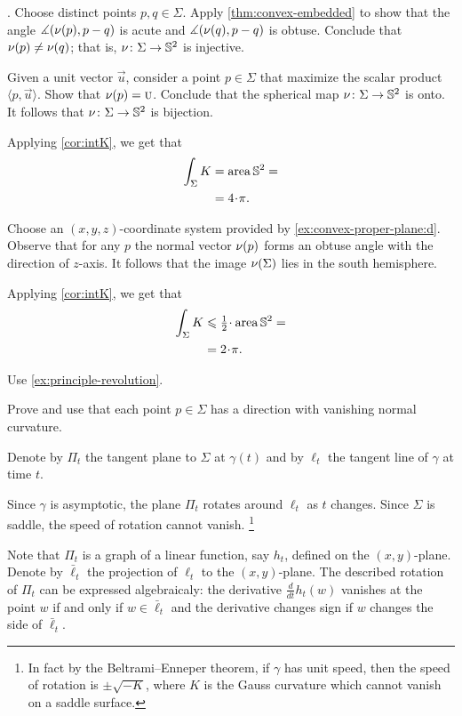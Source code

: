 \parbf{\ref{ex:intK}}.
Choose distinct points $p,q\in\Sigma$.
Apply \ref{thm:convex-embedded} to show that the angle 
$\measuredangle(\nu(p),p-q)$ is acute and $\measuredangle(\nu(q),p-q)$ is obtuse.
Conclude that $\nu(p)\ne\nu(q)$;
that is, $\nu\colon\Sigma\to\mathbb{S}^2$ is injective.


Given a unit vector $\vec u$, consider a point $p\in \Sigma$ that maximize the scalar product $\langle p,\vec u\rangle$.
Show that $\nu(p)=\textsc u$.
Conclude that the spherical map $\nu\colon\Sigma\to\mathbb{S}^2$ is onto.
It follows that $\nu\colon\Sigma\to\mathbb{S}^2$ is bijection.

Applying \ref{cor:intK}, we get that 
\begin{align*}
\int_\Sigma K&=\area\mathbb{S}^2=
\\
&=4\cdot\pi.
\end{align*}

 Choose an $(x,y,z)$-coordinate system provided by \ref{ex:convex-proper-plane:d}.
Observe that for any $p$ the normal vector $\nu(p)$ forms an obtuse angle with the direction of $z$-axis.
It follows that the image $\nu(\Sigma)$ lies in the south hemisphere.

Applying \ref{cor:intK}, we get that 
\begin{align*}
\int_\Sigma K&\le \tfrac12\cdot\area\mathbb{S}^2=
\\
&=2\cdot\pi.
\end{align*}

 Use \ref{ex:principle-revolution}.

 Prove and use that each point $p\in\Sigma$ has a direction with vanishing normal curvature.


 Denote by $\Pi_t$ the tangent plane to $\Sigma$ at $\gamma(t)$ and by $\ell_t$ the tangent line of $\gamma$ at time $t$.

Since $\gamma$ is asymptotic, the plane $\Pi_t$ rotates around $\ell_t$ as $t$ changes.
Since $\Sigma$ is saddle, the speed of rotation cannot vanish.%
\footnote{In fact by the Beltrami--Enneper theorem, if $\gamma$ has unit speed, then the speed of rotation is $\pm\sqrt{-K}$, where $K$ is the Gauss curvature which cannot vanish on a saddle surface.}

Note that $\Pi_t$ is a graph of a linear function, say $h_t$, defined on the $(x, y)$-plane.
Denote by $\bar\ell_t$ the projection of $\ell_t$ to the $(x, y)$-plane.
The described rotation of $\Pi_t$ can be expressed algebraicaly:
the derivative $\tfrac{d}{dt}h_t(w)$ vanishes at the point $w$ if and only if $w\in \bar\ell_t$ 
and the derivative changes sign if $w$ changes the side of $\bar\ell_t$.

